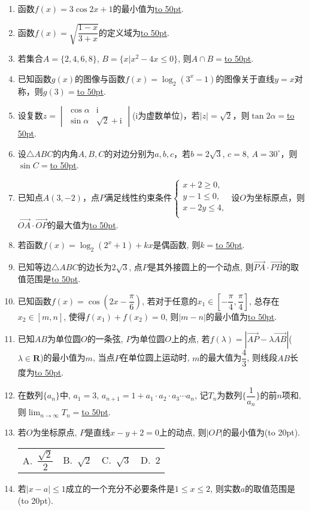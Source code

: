 \documentclass[10pt,a4paper]{article}
\newcommand{\blank}[1]{\underline{\hbox to #1pt{}}}
\newcommand{\bracket}[1]{(\hbox to #1pt{})}
\newcommand{\fourch}[4]{\par\begin{tabular}{p{.23\textwidth}p{.23\textwidth}p{.23\textwidth}p{.23\textwidth}}
A.~#1 &B.~#2& C.~#3& D.~#4
\end{tabular}}
\begin{document}
\begin{enumerate}[1.]
\item 函数$f(x)=3\cos 2x+1$的最小值为\blank{50}.
\item 函数$f(x)=\sqrt{\dfrac{1-x}{3+x}}$的定义域为\blank{50}.
\item 若集合$A=\{2,4,6,8\}$, $B=\{x|x^2-4x\le 0\}$, 则$A\cap B=$\blank{50}.
\item 已知函数$g(x)$的图像与函数$f(x)=\log_2(3^x-1)$的图像关于直线$y=x$对称，则$g(3)=$\blank{50}.
\item 设复数$z=\begin{vmatrix}   \cos \alpha  & \mathrm{i}  \\
\sin \alpha  & \sqrt{2}+\mathrm{i}\end{vmatrix}$($\mathrm{i}$为虚数单位)，若$|z|=\sqrt{2}$，则$\tan 2\alpha=$\blank{50}.
\item 设$\triangle ABC$的内角$A,B,C$的对边分别为$a,b,c$，若$b=2\sqrt{3}$, $c=8$, $A=30^\circ$，则$\sin C=$\blank{50}.
\item 已知点$A(3,-2)$，点$P$满足线性约束条件$\begin{cases}  x+2\ge 0,  \\   y-1\le 0,  \\   x-2y\le 4,  \\ \end{cases}$ 设$O$为坐标原点，则$\overrightarrow{OA}\cdot \overrightarrow{OP}$的最大值为\blank{50}.
\item 若函数$f(x)=\log_2(2^x+1)+kx$是偶函数, 则$k=$\blank{50}.
\item 已知等边$\triangle ABC$的边长为$2\sqrt{3}$, 点$P$是其外接圆上的一个动点, 则$\overrightarrow{PA}\cdot \overrightarrow{PB}$的取值范围是\blank{50}.
\item 已知函数$f(x)=\cos (2x-\dfrac \pi 6)$, 若对于任意的$x_1\in [-\dfrac \pi 4,\dfrac\pi 4]$, 总存在$x_2\in [m,n]$, 使得$f(x_1)+f(x_2)=0$, 则$|m-n|$的最小值为\blank{50}.
\item 已知$AB$为单位圆$O$的一条弦, $P$为单位圆$O$上的点, 若$f(\lambda)=|\overrightarrow{AP}-\lambda\overrightarrow{AB}|$($\lambda\in \mathbf{R}$)的最小值为$m$, 当点$P$在单位圆上运动时, $m$的最大值为$\dfrac 43$, 则线段$AB$长度为\blank{50}.
\item 在数列$\{a_n\}$中, $a_1=3$, $a_{n+1}=1+a_1\cdot a_2\cdot a_3\cdots a_n$, 记$T_n$为数列$\{\dfrac1 {a_n}\}$的前$n$项和, 则$\displaystyle\lim_{n\to\infty}T_n=$\blank{50}.
\item 若$O$为坐标原点, $P$是直线$x-y+2=0$上的动点, 则$|OP|$的最小值为\bracket{20}.
\fourch{$\dfrac{\sqrt{2}}2$}{$\sqrt{2}$}{$\sqrt{3}$}{$2$}
\item 若$|x-a|\le 1$成立的一个充分不必要条件是$1\le x\le 2$, 则实数$a$的取值范围是\bracket{20}.

\end{enumerate}
\end{document}
